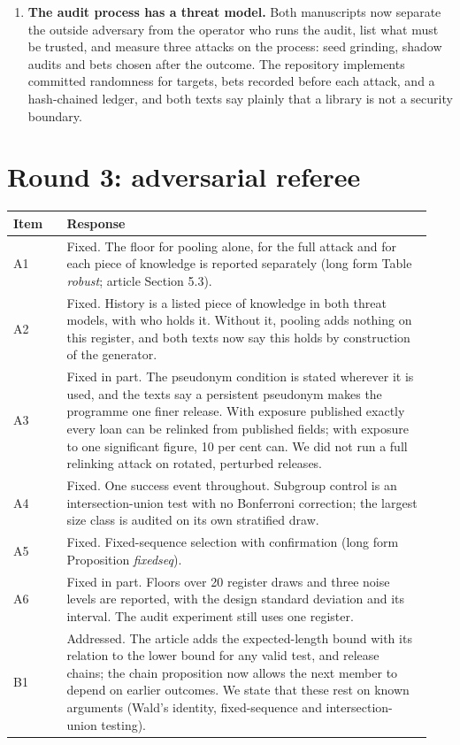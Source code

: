 \documentclass[11pt,a4paper]{article}
\begin{document}
\begin{enumerate}
\item \textbf{The audit process has a threat model.} Both manuscripts now separate the outside adversary from the operator who runs the audit, list what must be trusted, and measure three attacks on the process: seed grinding, shadow audits and bets chosen after the outcome. The repository implements committed randomness for targets, bets recorded before each attack, and a hash-chained ledger, and both texts say plainly that a library is not a security boundary.
\end{enumerate}

\section*{Round 3: adversarial referee}
\begin{longtable}{p{0.12\linewidth}p{0.82\linewidth}}
\toprule
Item & Response\\\midrule
A1 & Fixed. The floor for pooling alone, for the full attack and for each piece of knowledge is reported separately (long form Table \emph{robust}; article Section 5.3).\\
A2 & Fixed. History is a listed piece of knowledge in both threat models, with who holds it. Without it, pooling adds nothing on this register, and both texts now say this holds by construction of the generator.\\
A3 & Fixed in part. The pseudonym condition is stated wherever it is used, and the texts say a persistent pseudonym makes the programme one finer release. With exposure published exactly every loan can be relinked from published fields; with exposure to one significant figure, 10 per cent can. We did not run a full relinking attack on rotated, perturbed releases.\\
A4 & Fixed. One success event throughout. Subgroup control is an intersection-union test with no Bonferroni correction; the largest size class is audited on its own stratified draw.\\
A5 & Fixed. Fixed-sequence selection with confirmation (long form Proposition \emph{fixedseq}).\\
A6 & Fixed in part. Floors over 20 register draws and three noise levels are reported, with the design standard deviation and its interval. The audit experiment still uses one register.\\
B1 & Addressed. The article adds the expected-length bound with its relation to the lower bound for any valid test, and release chains; the chain proposition now allows the next member to depend on earlier outcomes. We state that these rest on known arguments (Wald's identity, fixed-sequence and intersection-union testing).\\

\end{longtable}
\end{document}
